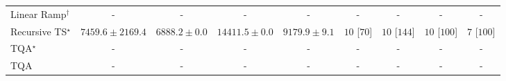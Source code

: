 \begin{tabular}{l|cccc|cccc|}
Linear Ramp$^\dagger$ & {\cellcolor[HTML]{000000}} \color[HTML]{F1F1F1} {\cellcolor{white}} \color{black} - & {\cellcolor[HTML]{000000}} \color[HTML]{F1F1F1} {\cellcolor{white}} \color{black} - & {\cellcolor[HTML]{000000}} \color[HTML]{F1F1F1} {\cellcolor{white}} \color{black} - & {\cellcolor[HTML]{000000}} \color[HTML]{F1F1F1} {\cellcolor{white}} \color{black} - & {\cellcolor[HTML]{000000}} \color[HTML]{F1F1F1} {\cellcolor{white}} \color{black} - & {\cellcolor[HTML]{000000}} \color[HTML]{F1F1F1} {\cellcolor{white}} \color{black} - & {\cellcolor[HTML]{000000}} \color[HTML]{F1F1F1} {\cellcolor{white}} \color{black} - & {\cellcolor[HTML]{000000}} \color[HTML]{F1F1F1} {\cellcolor{white}} \color{black} - \\
Recursive TS$^\star$ & {\cellcolor[HTML]{F6FBFC}} \color[HTML]{000000} $7459.6\pm 2169.4$ & {\cellcolor[HTML]{F7FCFD}} \color[HTML]{000000} $6888.2\pm 0.0$ & {\cellcolor[HTML]{DAE7F1}} \color[HTML]{000000} $14411.5\pm 0.0$ & {\cellcolor[HTML]{EFF6FA}} \color[HTML]{000000} $9179.9\pm 9.1$ & {\cellcolor[HTML]{49006A}} \color[HTML]{F1F1F1} $10$ [$70$] & {\cellcolor[HTML]{49006A}} \color[HTML]{F1F1F1} $10$ [$144$] & {\cellcolor[HTML]{49006A}} \color[HTML]{F1F1F1} $10$ [$100$] & {\cellcolor[HTML]{CD238F}} \color[HTML]{F1F1F1} $7$ [$100$] \\
TQA$^\star$ & {\cellcolor[HTML]{000000}} \color[HTML]{F1F1F1} {\cellcolor{white}} \color{black} - & {\cellcolor[HTML]{000000}} \color[HTML]{F1F1F1} {\cellcolor{white}} \color{black} - & {\cellcolor[HTML]{000000}} \color[HTML]{F1F1F1} {\cellcolor{white}} \color{black} - & {\cellcolor[HTML]{000000}} \color[HTML]{F1F1F1} {\cellcolor{white}} \color{black} - & {\cellcolor[HTML]{000000}} \color[HTML]{F1F1F1} {\cellcolor{white}} \color{black} - & {\cellcolor[HTML]{000000}} \color[HTML]{F1F1F1} {\cellcolor{white}} \color{black} - & {\cellcolor[HTML]{000000}} \color[HTML]{F1F1F1} {\cellcolor{white}} \color{black} - & {\cellcolor[HTML]{000000}} \color[HTML]{F1F1F1} {\cellcolor{white}} \color{black} - \\
TQA & {\cellcolor[HTML]{000000}} \color[HTML]{F1F1F1} {\cellcolor{white}} \color{black} - & {\cellcolor[HTML]{000000}} \color[HTML]{F1F1F1} {\cellcolor{white}} \color{black} - & {\cellcolor[HTML]{000000}} \color[HTML]{F1F1F1} {\cellcolor{white}} \color{black} - & {\cellcolor[HTML]{000000}} \color[HTML]{F1F1F1} {\cellcolor{white}} \color{black} - & {\cellcolor[HTML]{000000}} \color[HTML]{F1F1F1} {\cellcolor{white}} \color{black} - & {\cellcolor[HTML]{000000}} \color[HTML]{F1F1F1} {\cellcolor{white}} \color{black} - & {\cellcolor[HTML]{000000}} \color[HTML]{F1F1F1} {\cellcolor{white}} \color{black} - & {\cellcolor[HTML]{000000}} \color[HTML]{F1F1F1} {\cellcolor{white}} \color{black} - \\

\end{tabular}
